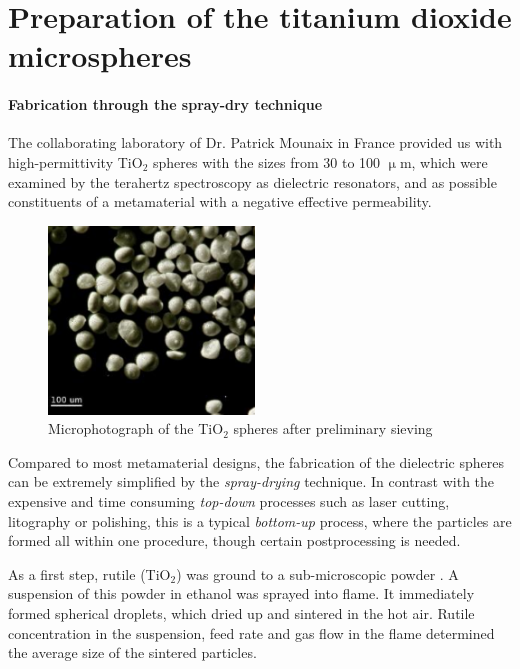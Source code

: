 
\section{Preparation of the titanium dioxide microspheres}
\paragraph{Fabrication through the spray-dry technique}%
The collaborating laboratory of Dr. Patrick Mounaix in France %
provided us with high-permittivity TiO$_{2}$ spheres with the sizes from 30 to 100 $\upmu$m, which were examined by the terahertz spectroscopy as dielectric resonators, and as possible constituents of a metamaterial with a negative effective permeability.
\begin{figure}[ht] \caption{Microphotograph of the TiO$_{2}$ spheres after preliminary sieving} \label{fg_microphoto} \centering 
\includegraphics[height=5cm]{img/microscope_TiO2_particles.pdf}
\end{figure}

Compared to most metamaterial designs, the fabrication of the dielectric spheres can be extremely simplified by the \textit{spray-drying} technique. In contrast with the expensive and time consuming \textit{top-down} processes such as laser cutting, litography or polishing, this is a typical \textit{bottom-up} process, where the particles are formed all within one procedure, though certain postprocessing is needed. 

As a first step, rutile (TiO$_{2}$) was ground to a sub-microscopic powder \cite[pp. 91-93]{yahiaoui2011phd}. A suspension of this powder in ethanol was sprayed into flame. It immediately formed spherical droplets, which dried up and sintered in the hot air. Rutile concentration in the suspension, feed rate and gas flow in the flame determined the average size of the sintered particles.

